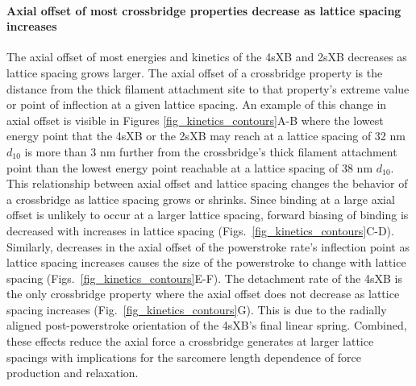 \documentclass[]{article}
\begin{document}
\paragraph{Axial offset of most crossbridge properties decrease as lattice spacing increases} %
The axial offset of most energies and kinetics of the 4sXB and 2sXB decreases as lattice spacing grows larger.
The axial offset of a crossbridge property is the distance from the thick filament attachment site to that property's extreme value or point of inflection at a given lattice spacing. 
An example of this change in axial offset is visible in Figures \ref{fig_kinetics_contours}A-B where the lowest energy point that the 4sXB or the 2sXB may reach at a lattice spacing of 32 nm $d_{10}$ is more than 3 nm further from the crossbridge's thick filament attachment point than the lowest energy point reachable at a lattice spacing of 38 nm $d_{10}$.
This relationship between axial offset and lattice spacing changes the behavior of a crossbridge as lattice spacing grows or shrinks.
Since binding at a large axial offset is unlikely to occur at a larger lattice spacing, forward biasing of binding is decreased with increases in lattice spacing (Figs.~\ref{fig_kinetics_contours}C-D). 
Similarly, decreases in the axial offset of the powerstroke rate's inflection point as lattice spacing increases causes the size of the powerstroke to change with lattice spacing (Figs.~\ref{fig_kinetics_contours}E-F).
The detachment rate of the 4sXB is the only crossbridge property where the axial offset does not decrease as lattice spacing increases (Fig.~\ref{fig_kinetics_contours}G).
This is due to the radially aligned post-powerstroke orientation of the 4sXB's final linear spring. 
Combined, these effects reduce the axial force a crossbridge generates at larger lattice spacings with implications for the sarcomere length dependence of force production and relaxation. 
\end{document}

